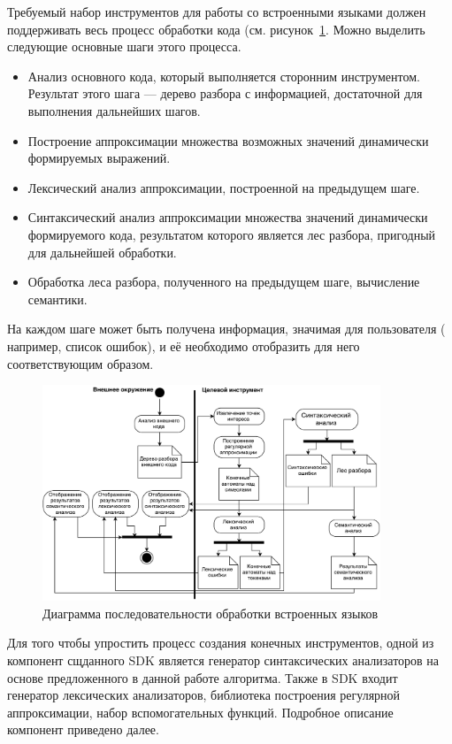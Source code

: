 Требуемый набор инструментов для работы со встроенными языками должен поддерживать весь процесс обработки кода (см. рисунок~\ref{fig:SeqSelProcessing}. Можно выделить следующие основные шаги этого процесса.
\begin{itemize}
    \item Анализ основного кода, который выполняется сторонним инструментом. Результат этого шага --- дерево разбора с информацией, достаточной для выполнения дальнейших шагов.
    \item Построение аппроксимации множества возможных значений динамически формируемых выражений.
    \item Лексический анализ аппроксимации, построенной на предыдущем шаге.
    \item Синтаксический анализ аппроксимации множества значений динамически формируемого кода, результатом которого является лес разбора, пригодный для дальнейшей обработки.
    \item Обработка леса разбора, полученного на предыдущем шаге, вычисление семантики.
\end{itemize}

На каждом шаге может быть получена информация, значимая для пользователя ( например, список ошибок), и её необходимо отобразить для него соответствующим образом.

\begin{figure}[h!]
\begin{center}
\includegraphics[width=0.9\textwidth]{pics/Activ_SEL_Processing}
\caption{Диаграмма последовательности обработки встроенных языков}
\label{fig:SeqSelProcessing} 
\end{center}
\end{figure}

Для того чтобы упростить процесс создания конечных инструментов, одной из компонент сщданного SDK является генератор синтаксических анализаторов на основе предложенного в данной работе алгоритма. Также в SDK входит генератор лексических анализаторов, библиотека построения регулярной аппроксимации, набор вспомогательных функций. Подробное описание компонент приведено далее.


